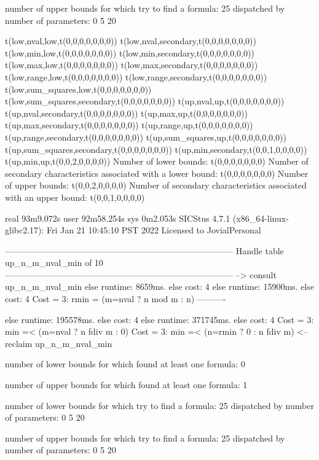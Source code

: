 number of upper bounds for which try to find a formula: 25
dispatched by number of parameters: 0  5  20

t(low,nval,low,t(0,0,0,0,0,0,0))
t(low,nval,secondary,t(0,0,0,0,0,0,0))
t(low,min,low,t(0,0,0,0,0,0,0))
t(low,min,secondary,t(0,0,0,0,0,0,0))
t(low,max,low,t(0,0,0,0,0,0,0))
t(low,max,secondary,t(0,0,0,0,0,0,0))
t(low,range,low,t(0,0,0,0,0,0,0))
t(low,range,secondary,t(0,0,0,0,0,0,0))
t(low,sum_squares,low,t(0,0,0,0,0,0,0))
t(low,sum_squares,secondary,t(0,0,0,0,0,0,0))
t(up,nval,up,t(0,0,0,0,0,0,0))
t(up,nval,secondary,t(0,0,0,0,0,0,0))
t(up,max,up,t(0,0,0,0,0,0,0))
t(up,max,secondary,t(0,0,0,0,0,0,0))
t(up,range,up,t(0,0,0,0,0,0,0))
t(up,range,secondary,t(0,0,0,0,0,0,0))
t(up,sum_squares,up,t(0,0,0,0,0,0,0))
t(up,sum_squares,secondary,t(0,0,0,0,0,0,0))
t(up,min,secondary,t(0,0,1,0,0,0,0))
t(up,min,up,t(0,0,2,0,0,0,0))
Number of lower bounds:                                             t(0,0,0,0,0,0,0)
Number of secondary characteristics associated with a lower bound:  t(0,0,0,0,0,0,0)
Number of upper bounds:                                             t(0,0,2,0,0,0,0)
Number of secondary characteristics associated with an upper bound: t(0,0,1,0,0,0,0)

real	93m9.072s
user	92m58.254s
sys	0m2.053s
SICStus 4.7.1 (x86_64-linux-glibc2.17): Fri Jan 21 10:45:10 PST 2022
Licensed to JovialPersonal


--------------------------------------------------------------------------------
Handle table up_n_m_nval_min of 10
--------------------------------------------------------------------------------
--> consult up_n_m_nval_min
else runtime: 8659ms. else cost: 4
else runtime: 15900ms. else cost: 4
Cost =  3:  rmin = (m=nval ? n mod m : n) %
----------

else runtime: 195578ms. else cost: 4
else runtime: 371745ms. else cost: 4
Cost =  3:  min =< (m=nval ? n fdiv m : 0) %
Cost =  3:  min =< (n=rmin ? 0 : n fdiv m)
<-- reclaim up_n_m_nval_min

number of lower bounds for which found at least one formula: 0

number of upper bounds for which found at least one formula: 1

number of lower bounds for which try to find a formula: 25
dispatched by number of parameters: 0  5  20

number of upper bounds for which try to find a formula: 25
dispatched by number of parameters: 0  5  20

